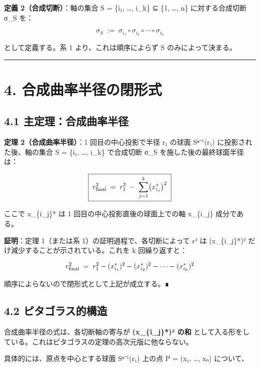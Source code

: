 \documentclass[a4paper,11pt]{ltjsarticle}
\theoremstyle{definition}
\theoremstyle{remark}
\begin{document}
\textbf{定義 2（合成切断）}：軸の集合 S = \{i₁, \ldots, i\_k\} ⊆ \{1,
\ldots, n\} に対する合成切断 σ\_S を：

\[
\sigma_S \;:=\; \sigma_{i_1} \circ \sigma_{i_2} \circ \cdots \circ \sigma_{i_k}
\]

として定義する。系 1 より、これは順序によらず S のみによって決まる。

\begin{center}\rule{0.5\linewidth}{0.5pt}\end{center}

\section{4.
合成曲率半径の閉形式}\label{ux5408ux6210ux66f2ux7387ux534aux5f84ux306eux9589ux5f62ux5f0f}

\subsection{4.1
主定理：合成曲率半径}\label{ux4e3bux5b9aux7406ux5408ux6210ux66f2ux7387ux534aux5f84}

\textbf{定理 2（合成曲率半径）}：1 回目の中心投影で半径 r₁ の球面
Sⁿ⁻¹(r₁) に投影された後、軸の集合 S = \{i₁, \ldots, i\_k\} で合成切断
σ\_S を施した後の最終球面半径は：

\[
\boxed{\;r_{\rm final}^{2} \;=\; r_{1}^{2} \;-\; \sum_{j=1}^{k}\bigl(x_{i_j}^{*}\bigr)^{2}\;}
\]

ここで x\_\{i\_j\}* は 1 回目の中心投影直後の球面上での軸 x\_\{i\_j\}
成分である。

\textbf{証明}：定理 1（または系 1）の証明過程で、各切断によって r² は
(x\_\{i\_j\}*)² だけ減少することが示されている。これを k 回繰り返すと：

\[
r_{\rm final}^{2} \;=\; r_{1}^{2} - (x_{i_1}^{*})^{2} - (x_{i_2}^{*})^{2} - \cdots - (x_{i_k}^{*})^{2}
\]

順序によらないので閉形式として上記が成立する。∎

\subsection{4.2
ピタゴラス的構造}\label{ux30d4ux30bfux30b4ux30e9ux30b9ux7684ux69cbux9020}

合成曲率半径の式は、各切断軸の寄与が \textbf{(x\_\{i\_j\}*)² の和}
として入る形をしている。これはピタゴラスの定理の高次元版に他ならない。

具体的には、原点を中心とする球面 Sⁿ⁻¹(r₁) 上の点 P = (x₁, \ldots, xₙ)
について、
\end{document}
